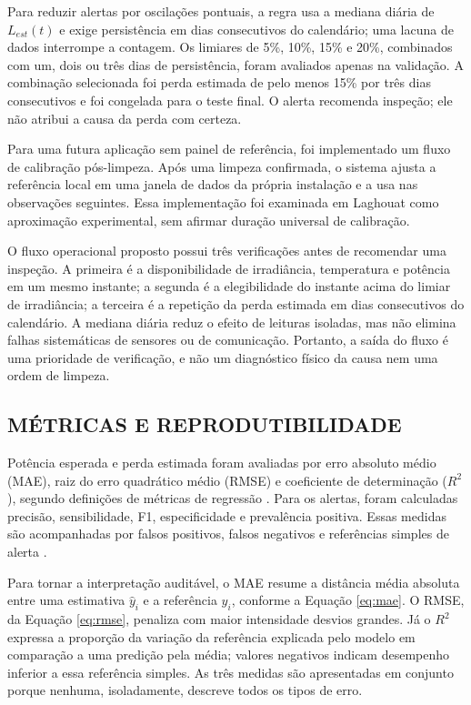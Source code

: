 \documentclass{UNESC}
\begin{document}
Para reduzir alertas por oscilações pontuais, a regra usa a mediana diária de $L_{est}(t)$ e exige persistência em dias consecutivos do calendário; uma lacuna de dados interrompe a contagem. Os limiares de 5\%, 10\%, 15\% e 20\%, combinados com um, dois ou três dias de persistência, foram avaliados apenas na validação. A combinação selecionada foi perda estimada de pelo menos 15\% por três dias consecutivos e foi congelada para o teste final. O alerta recomenda inspeção; ele não atribui a causa da perda com certeza.

Para uma futura aplicação sem painel de referência, foi implementado um fluxo de calibração pós-limpeza. Após uma limpeza confirmada, o sistema ajusta a referência local em uma janela de dados da própria instalação e a usa nas observações seguintes. Essa implementação foi examinada em Laghouat como aproximação experimental, sem afirmar duração universal de calibração.

O fluxo operacional proposto possui três verificações antes de recomendar uma inspeção. A primeira é a disponibilidade de irradiância, temperatura e potência em um mesmo instante; a segunda é a elegibilidade do instante acima do limiar de irradiância; a terceira é a repetição da perda estimada em dias consecutivos do calendário. A mediana diária reduz o efeito de leituras isoladas, mas não elimina falhas sistemáticas de sensores ou de comunicação. Portanto, a saída do fluxo é uma prioridade de verificação, e não um diagnóstico físico da causa nem uma ordem de limpeza.

\subsection{MÉTRICAS E REPRODUTIBILIDADE}

Potência esperada e perda estimada foram avaliadas por erro absoluto médio (MAE), raiz do erro quadrático médio (RMSE) e coeficiente de determinação ($R^2$), segundo definições de métricas de regressão \cite{sklearn_metricas}. Para os alertas, foram calculadas precisão, sensibilidade, F1, especificidade e prevalência positiva. Essas medidas são acompanhadas por falsos positivos, falsos negativos e referências simples de alerta \cite{saito2015}.

Para tornar a interpretação auditável, o MAE resume a distância média absoluta entre uma estimativa $\hat{y}_i$ e a referência $y_i$, conforme a Equação \ref{eq:mae}. O RMSE, da Equação \ref{eq:rmse}, penaliza com maior intensidade desvios grandes. Já o $R^2$ expressa a proporção da variação da referência explicada pelo modelo em comparação a uma predição pela média; valores negativos indicam desempenho inferior a essa referência simples. As três medidas são apresentadas em conjunto porque nenhuma, isoladamente, descreve todos os tipos de erro.
\end{document}
